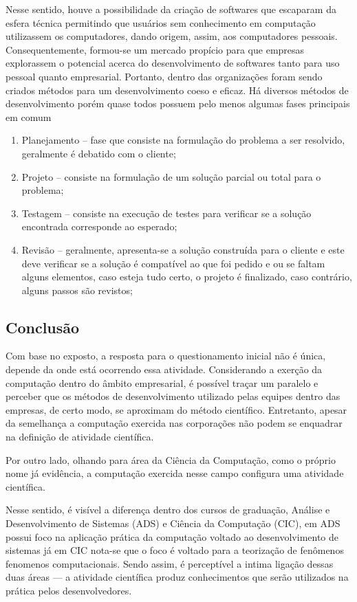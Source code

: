 Nesse sentido, houve a possibilidade da criação de softwares que escaparam da esfera técnica permitindo que usuários sem conhecimento em computação utilizassem os computadores, dando origem, assim, aos computadores pessoais. Consequentemente, formou-se um mercado propício para que empresas explorassem o potencial acerca do desenvolvimento de softwares tanto para uso pessoal quanto empresarial. Portanto, dentro das organizações foram sendo criados métodos para um desenvolvimento coeso e eficaz. Há diversos métodos de desenvolvimento porém quase todos possuem pelo menos algumas fases principais em comum

\begin{enumerate}
    \item Planejamento -- fase que consiste na formulação do problema a ser resolvido, geralmente é debatido com o cliente;
    \item Projeto -- consiste na formulação de um solução parcial ou total para o problema;
    \item Testagem -- consiste na execução de testes para verificar se a solução encontrada corresponde ao esperado;
    \item Revisão -- geralmente, apresenta-se a solução construída para o cliente e este deve verificar se a solução é compatível ao que foi pedido e ou se faltam alguns elementos, caso esteja tudo certo, o projeto é finalizado, caso contrário, alguns passos são revistos;
    
\end{enumerate}
\subsection{Conclusão }

Com base no exposto, a resposta para o questionamento inicial não é única, depende da onde está ocorrendo essa atividade. Considerando a exerção da computação dentro do âmbito empresarial, é possível traçar um paralelo e perceber que os métodos de desenvolvimento utilizado pelas equipes dentro das empresas, de certo modo, se aproximam do método científico. Entretanto, apesar da semelhança a computação exercida nas corporações não podem se enquadrar na definição de atividade científica. 

Por outro lado, olhando para área da Ciência da Computação, como o próprio nome já evidência, a computação exercida nesse campo configura uma atividade científica.

Nesse sentido, é visível a diferença dentro dos cursos de graduação, Análise e Desenvolvimento de Sistemas (ADS) e Ciência da Computação (CIC), em ADS possui foco na aplicação prática da computação voltado ao desenvolvimento de sistemas já em CIC nota-se que o foco é voltado para a teorização de fenômenos \gls{fenomenos} computacionais. Sendo assim, é perceptível a intima ligação dessas duas áreas --- a atividade científica produz conhecimentos que serão utilizados na prática pelos desenvolvedores.

